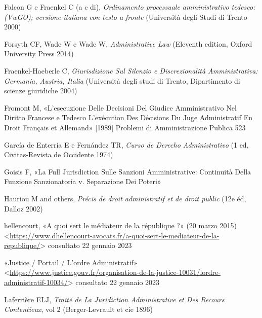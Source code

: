 \documentclass[12pt,it,a4paper,]{report}
\newlength{\cslhangindent}
\newenvironment{CSLReferences}[2] %
 {%
  \setlength{\parindent}{0pt}
  \ifodd #1 \everypar{\setlength{\hangindent}{\cslhangindent}}\ignorespaces\fi
  \ifnum #2 > 0
  \setlength{\parskip}{#2\baselineskip}
  \fi
 }%
 {}
\begin{document}
\begin{CSLReferences}{0}{0}
\leavevmode{}%
Falcon G e Fraenkel C (a c di), \emph{Ordinamento processuale
amministrativo tedesco: (VwGO); versione italiana con testo a fronte}
({Università degli Studi di Trento} 2000)

\leavevmode{}%
Forsyth CF, Wade W e Wade W, \emph{Administrative Law} (Eleventh
edition, {Oxford University Press} 2014)

\leavevmode{}%
Fraenkel-Haeberle C, \emph{Giurisdizione Sul Silenzio e Discrezionalità
Amministrativa: {Germania}, {Austria}, {Italia}} ({Università degli
studi di Trento, Dipartimento di scienze giuridiche} 2004)

\leavevmode{}%
Fromont M, {«L'esecuzione Delle Decisioni Del Giudice Amministrativo Nel
Diritto Francese e Tedesco {L}'exécution Des Décisions Du Juge
Administratif En Droit Français et Allemand»} {[}1989{]} Problemi di
Amministrazione Publica 523

\leavevmode{}%
García de Enterría E e Fernández TR, \emph{Curso de Derecho
Administrativo} (1 ed, {Civitas-Revista de Occidente} 1974)

\leavevmode{}%
Goisis F, {«La Full Jurisdiction Sulle Sanzioni Amministrative:
Continuità Della Funzione Sanzionatoria v. Separazione Dei Poteri»}

\leavevmode{}%
Hauriou M and others, \emph{Précis de droit administratif et de droit
public} (12e éd, {Dalloz} 2002)

\leavevmode{}%
hellencourt, {«A quoi sert le médiateur de la république ?»} (20 marzo
2015)
\textless{}\url{https://www.dhellencourt-avocats.fr/a-quoi-sert-le-mediateur-de-la-republique/}\textgreater{}
consultato 22 gennaio 2023

\leavevmode{}%
{«Justice / {Portail} / {L}'ordre Administratif»}
\textless{}\url{https://www.justice.gouv.fr/organisation-de-la-justice-10031/lordre-administratif-10034/}\textgreater{}
consultato 22 gennaio 2023

\leavevmode{}%
Laferrière ELJ, \emph{Traité de La Juridiction Administrative et Des
Recours Contentieux}, vol 2 ({Berger-Levrault et cie} 1896)


\end{CSLReferences}
\end{document}
